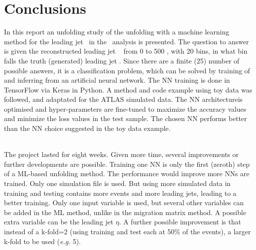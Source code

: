 \section{Conclusions}
\label{sec:Conclusions}

In this report an unfolding study of the unfolding with a machine learning method for the leading jet \pt~in the \ttbaremu~analysis is presented. The question to answer is given the reconstructed leading jet \pt~ from 0 to 500 \GeV, with 20 \GeV bins, in what bin falls the truth (generated) leading jet \pt. Since there are a finite (25) number of possible answers, it is a classification problem, which can be solved by training of and inferring from an artificial neural network. The NN training is done in TensorFlow via Keras in Python. A method and code example using toy data was followed, and adaptated for the ATLAS simulated data. The NN architectureis optimised  and hyper-parameters are fine-tuned to maximize the accuracy values and minimize the loss values in the test sample. The chosen NN performs better than the NN choice suggested in the toy data example. 

\ \\The project lasted for eight weeks. Given more time, several improvements or further developments are possible. Training one NN is only the first (zeroth) step of a ML-based unfolding method. The performance would improve more NNs are trained. Only one simulation file is used. But using more simulated data in training and testing contains more events and more leading jets, leading to a better training. Only one input variable is used, but several other variables can be added in the ML method, unlike in the migration matrix method. A possible extra variable can be the leading jet $\eta$. A further possible improvement is that instead of a k-fold=2 (using training and test each at 50\% of the events), a larger k-fold to be used (\emph {e.g.} 5). 
